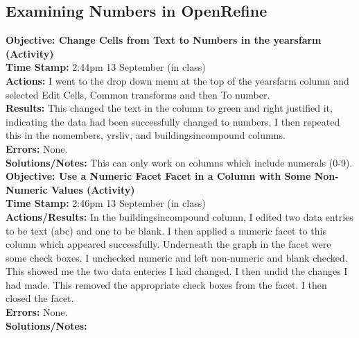 \documentclass{article}
\begin{document}
\begin{FlushLeft}
\subsection{Examining Numbers in OpenRefine}\label{sec:numbers}
\textbf{Objective: Change Cells from Text to Numbers in the years\textunderscore farm (Activity)}\\ 
\textbf{Time Stamp:} 2:44pm 13 September (in class)\\
\textbf{Actions:} I went to the drop down menu at the top of the years\textunderscore farm column and selected Edit Cells, Common transforms and then To number.\\
\textbf{Results:} This changed the text in the column to green and right justified it, indicating the data had been successfully changed to numbers. I then repeated this in the no\textunderscore members, yrs\textunderscore liv, and buildings\textunderscore in\textunderscore compound columns.\\
\textbf{Errors:} None.\\
\textbf{Solutions/Notes:} This can only work on columns which include numerals (0-9).\\
\vspace{5mm}
\textbf{Objective: Use a Numeric Facet Facet in a Column with Some Non-Numeric Values (Activity)}\\ 
\textbf{Time Stamp:} 2:46pm 13 September (in class)\\
\textbf{Actions/Results:} In the buildings\textunderscore in\textunderscore compound column, I edited two data entries to be text (abc) and one to be blank. I then applied a numeric facet to this column which appeared successfully. Underneath the graph in the facet were some check boxes. I unchecked numeric and left non-numeric and blank checked. This showed me the two data enteries I had changed. I then undid the changes I had made. This removed the appropriate check boxes from the facet. I then closed the facet.\\
\textbf{Errors:} None.\\
\textbf{Solutions/Notes:}\\
\vspace{5mm}


\end{FlushLeft}
\end{document}
